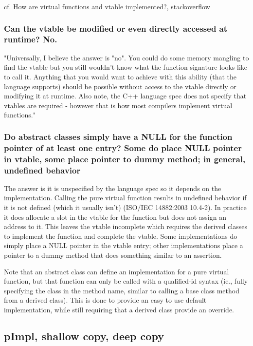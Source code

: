 \documentclass[10pt]{amsart}
\begin{document}
\begin{multicols*}{2}
cf. \href{https://stackoverflow.com/questions/99297/how-are-virtual-functions-and-vtable-implemented}{How are virtual functions and vtable implemented?, stackoverflow}  

\subsubsection{Can the vtable be modified or even directly accessed at runtime?  No.}  

"Universally, I believe the answer is "no". You could do some memory mangling to find the vtable but you still wouldn't know what the function signature looks like to call it. Anything that you would want to achieve with this ability (that the language supports) should be possible without access to the vtable directly or modifying it at runtime. Also note, the C++ language spec does not specify that vtables are required - however that is how most compilers implement virtual functions."  

\subsubsection{Do abstract classes simply have a NULL for the function pointer of at least one entry?  Some do place NULL pointer in vtable, some place pointer to dummy method; in general, undefined behavior}

The answer is it is unspecified by the language spec so it depends on the implementation. Calling the pure virtual function results in undefined behavior if it is not defined (which it usually isn't) (ISO/IEC 14882:2003 10.4-2). In practice it does allocate a slot in the vtable for the function but does not assign an address to it. This leaves the vtable incomplete which requires the derived classes to implement the function and complete the vtable. Some implementations do simply place a NULL pointer in the vtable entry; other implementations place a pointer to a dummy method that does something similar to an assertion.

Note that an abstract class can define an implementation for a pure virtual function, but that function can only be called with a qualified-id syntax (ie., fully specifying the class in the method name, similar to calling a base class method from a derived class). This is done to provide an easy to use default implementation, while still requiring that a derived class provide an override.

\subsection{pImpl, shallow copy, deep copy}  


\end{multicols*}
\end{document}
